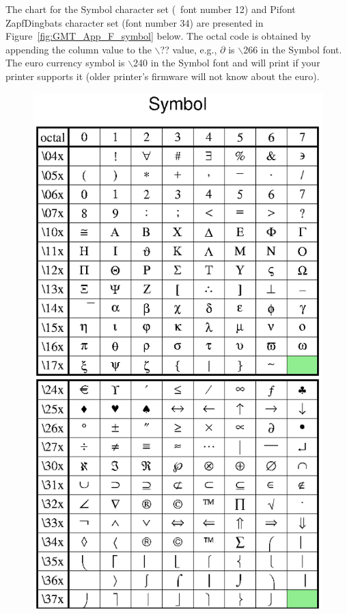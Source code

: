 \clearpage


The chart for the Symbol character set (\GMT\ font number 12) and Pifont ZapfDingbats character set
(font number 34)
are presented in Figure~\ref{fig:GMT_App_F_symbol} below. The octal code is obtained by appending the
column value to the $\backslash$?? value, e.g., $\partial$ is
$\backslash$266 in the Symbol font.  The euro currency symbol is $\backslash$240 in the Symbol font and will
print if your printer supports it (older printer's firmware will not know about the euro).

\begin{figure}[h]
   \includegraphics[scale=0.92]{scripts/GMT_App_F_symbol}\hfill

\end{figure}
